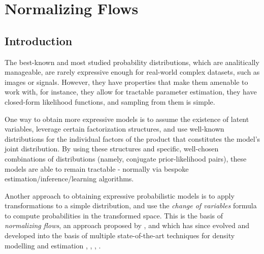 \section{Normalizing Flows}
\label{section:probmodel}

\subsection{Introduction}
The best-known and most studied probability distributions, which are analitically
manageable, are rarely expressive enough for real-world complex datasets, such
as images or signals. However, they have properties that make them amenable to
work with, for instance, they allow for tractable parameter estimation,
they have closed-form likelihood functions, and sampling from them is simple.

One way to obtain more expressive models is to assume the existence of latent variables, leverage certain factorization
structures, and use well-known distributions for the individual factors of the product that
constitutes the model's joint distribution. By using these structures and
specific, well-chosen combinations of distributions (namely, conjugate prior-likelihood pairs),
these models are able to remain tractable - normally via bespoke estimation/inference/learning
algorithms.

Another approach to obtaining expressive probabilistic models is to apply
transformations to a simple distribution, and use the \emph{change of variables}
formula to compute probabilities in the transformed space. This is the basis
of \emph{normalizing flows}, an approach proposed by \textcite{shakir_nf},
and which has since evolved and developed into the basis of multiple state-of-the-art
techniques for density modelling and estimation \autocite{Glow}, \autocite{real-nvp}, \autocite{bnaf19},
\autocite{maf}.

